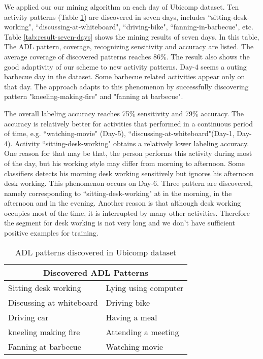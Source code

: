 \documentclass{sigchi}
\begin{document}
     We applied our our mining algorithm on each day of Ubicomp dataset.
     Ten activity patterns (Table \ref{tab: ADL patterns discovered}) are discovered in seven days, includes ``sitting-desk-working", ``discussing-at-whiteboard", ``driving-bike", ``fanning-in-barbecue", etc.
     Table \ref{tab:result-seven-days} shows the mining results of seven days.
     In this table, The ADL pattern, coverage, recognizing sensitivity and accuracy are listed.
     The average coverage of discovered patterns reaches 86\%.
     The result also shows the good adaptivity of our scheme to new activity patterns.
     Day-4 seems a outing barbecue day in the dataset. Some barbecue related activities appear only on that day.
     The approach adapts to this phenomenon by successfully discovering pattern "kneeling-making-fire" and "fanning at barbecue".

     The overall labeling accuracy reaches 75\% sensitivity and 79\% accuracy.
     The accuracy is relatively better for activities that performed in a continuous period of time, e.g. ``watching-movie" (Day-5), ``discussing-at-whiteboard"(Day-1, Day-4).
     Activity ``sitting-desk-working" obtains a relatively lower labeling accuracy.
     One reason for that may be that, the person performs this activity during most of the day, but his working style may differ from morning to afternoon.
     Some classifiers detects his morning desk working sensitively but ignores his afternoon desk working.
     This phenomenon occurs on Day-6. Three pattern are discovered, namely corresponding to ``sitting-desk-working" at in the morning, in the afternoon and in the evening.
     Another reason is that although desk working occupies most of the time, it is interrupted by many other activities.
     Therefore the segment for desk working is not very long and we don't have sufficient positive examples for training.

\begin{table}[htbp]
    \begin{tabular}{rr}
    \toprule
    \multicolumn{2}{c}{\textbf{Discovered ADL Patterns}} \\
    \midrule
    \multicolumn{1}{l}{Sitting desk working} & \multicolumn{1}{l}{Lying using computer} \\
    \multicolumn{1}{l}{Discussing at whiteboard} & \multicolumn{1}{l}{Driving bike} \\
    \multicolumn{1}{l}{Driving car} & \multicolumn{1}{l}{Having a meal} \\
    \multicolumn{1}{l}{kneeling making fire} & \multicolumn{1}{l}{Attending a meeting} \\
    \multicolumn{1}{l}{Fanning at barbecue} & \multicolumn{1}{l}{Watching movie} \\
    \bottomrule
    \end{tabular}%
    \caption{ADL patterns discovered in Ubicomp dataset}
  \label{tab: ADL patterns discovered}%
\end{table}%
\end{document}
